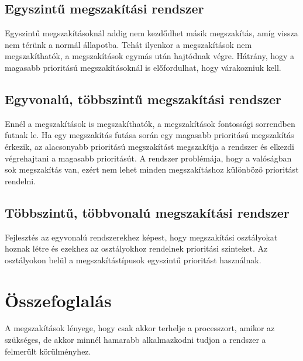 \subsection{Egyszintű megszakítási rendszer}
Egyszintű megszakításoknál addig nem kezdődhet másik megszakítás, amíg vissza nem térünk a normál állapotba.
Tehát ilyenkor a megszakítások nem megszakíthatók, a megszakítások egymás után hajtódnak végre.
Hátrány, hogy a magasabb prioritású megszakításoknál is előfordulhat, hogy várakozniuk kell.

\subsection{Egyvonalú, többszintű megszakítási rendszer}
Ennél a megszakítások is megszakíthatók, a megszakítások fontossági sorrendben futnak le.
Ha egy megszakítás futása során egy magasabb prioritású megszakítás érkezik, az alacsonyabb prioritású megszakítást megszakítja a rendszer és elkezdi végrehajtani a magasabb prioritásút.
A rendszer problémája, hogy a valóságban sok megszakítás van, ezért nem lehet minden megszakításhoz különböző prioritást rendelni.

\subsection{Többszintű, többvonalú megszakítási rendszer}
Fejlesztés az egyvonalú rendszerekhez képest, hogy megszakítási osztályokat hoznak létre és ezekhez az osztályokhoz rendelnek prioritási szinteket.
Az osztályokon belül a megszakítástípusok egyszintű prioritást használnak.

\section{Összefoglalás}
A megszakítások lényege, hogy csak akkor terhelje a processzort, amikor az szükséges, de akkor minnél hamarabb alkalmazkodni tudjon a rendszer a felmerült körülményhez.